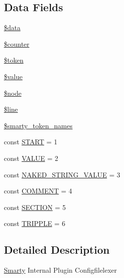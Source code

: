 \subsection*{Data Fields}
\begin{DoxyCompactItemize}
\item 
\hyperlink{class_smarty___internal___configfilelexer_a6efc15b5a2314dd4b5aaa556a375c6d6}{\$data}
\item 
\hyperlink{class_smarty___internal___configfilelexer_adc0a189fac719187ba2e6f01ca0f2466}{\$counter}
\item 
\hyperlink{class_smarty___internal___configfilelexer_a00ae4fcafb1145f5e968bdf920f83e2e}{\$token}
\item 
\hyperlink{class_smarty___internal___configfilelexer_a0f298096f322952a72a50f98a74c7b60}{\$value}
\item 
\hyperlink{class_smarty___internal___configfilelexer_a15955933e72700564e1a76d7f97c1ac7}{\$node}
\item 
\hyperlink{class_smarty___internal___configfilelexer_a52f469b0182d9abac2d0f20548680c9c}{\$line}
\item 
\hyperlink{class_smarty___internal___configfilelexer_a1fec71dfba5804095f77f513d402aea2}{\$smarty\+\_\+token\+\_\+names}
\item 
const \hyperlink{class_smarty___internal___configfilelexer_a9f6555155d644ea25adfe7e156624c2d}{S\+T\+A\+R\+T} = 1
\item 
const \hyperlink{class_smarty___internal___configfilelexer_a3ec449ec46c5758fbc92b311afa9381e}{V\+A\+L\+U\+E} = 2
\item 
const \hyperlink{class_smarty___internal___configfilelexer_a7c2d4eba644e6914d36c081f310d23d3}{N\+A\+K\+E\+D\+\_\+\+S\+T\+R\+I\+N\+G\+\_\+\+V\+A\+L\+U\+E} = 3
\item 
const \hyperlink{class_smarty___internal___configfilelexer_a4951cfda1f15c6edbf240a5c44971eb0}{C\+O\+M\+M\+E\+N\+T} = 4
\item 
const \hyperlink{class_smarty___internal___configfilelexer_aa9c8935ee3a3ee367348e0d2dda41648}{S\+E\+C\+T\+I\+O\+N} = 5
\item 
const \hyperlink{class_smarty___internal___configfilelexer_a55625e805f3ad4a4709a908e51a484e8}{T\+R\+I\+P\+P\+L\+E} = 6
\end{DoxyCompactItemize}


\subsection{Detailed Description}
\hyperlink{class_smarty}{Smarty} Internal Plugin Configfilelexer 

